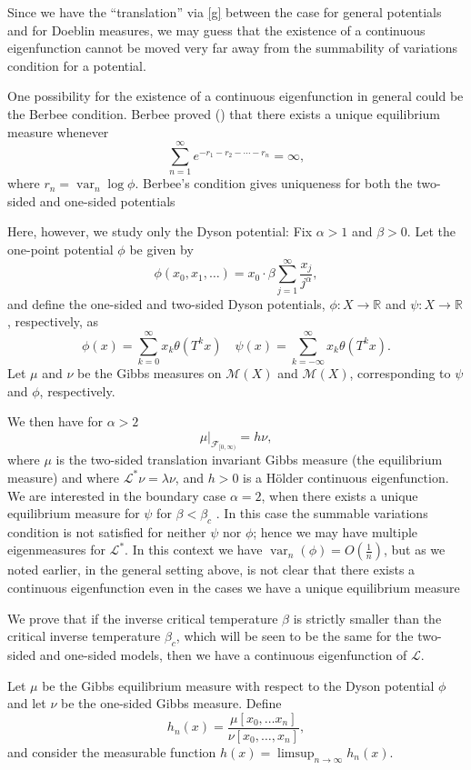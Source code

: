 \documentclass[11pt, a4paper]{amsart}
\theoremstyle{definition}
\theoremstyle{remark}
\providecommand{\RR}{\mathbb{R}}
\providecommand{\CM}{\mathscr{M}}
\providecommand{\opn}{\operatorname}
\providecommand{\var}{\opn{var}}
\def\X{X}
\begin{document}
Since we have the ``translation'' via \eqref{g} between the case for general potentials and for Doeblin measures, we may guess that the existence of a continuous eigenfunction cannot be moved very far away from the summability of variations condition for a potential.

One possibility for the existence of a continuous eigenfunction in general could be the Berbee condition.
Berbee proved (\cite{berbee89}) that there exists a
unique equilibrium measure whenever
\begin{equation}\label{berbee}
  \sum_{n=1}^\infty e^{-r_1-r_2-\cdots-r_n}=\infty,    
\end{equation}
where $r_n=\var_n \log \phi$. Berbee's condition
gives uniqueness for both the two-sided and
one-sided potentials

Here, however, we study only the Dyson potential: Fix $\alpha>1$ and $\beta>0$. Let the one-point potential $\phi$ be given by
$$\phi(x_0, x_1,\ldots)=x_0\cdot \beta \sum_{j=1}^\infty \frac{x_j}{j^\alpha},$$
and define the one-sided and two-sided 
Dyson potentials, $\phi:\X\to \RR$ and $\psi:\X\to\RR$, respectively, as
$$
\phi(x)=\sum_{k=0}^\infty x_k \theta (T^k x) \quad
\psi(x)=\sum_{k=-\infty}^\infty x_k \theta(T^k x).
$$
Let $\mu$ and $\nu$ be the Gibbs measures on $\CM(\X)$ and $\CM(\X)$, corresponding to $\psi$ and $\phi$, respectively.

We then have for $\alpha>2$
$$\mu\vert_{{\mathcal F}_{[0,\infty)}}= h\nu,$$
where $\mu$ is the two-sided translation invariant Gibbs measure (the
equilibrium measure) and where ${\mathcal L}^*\nu=\lambda \nu$, and $h>0$ is a
H\"older continuous eigenfunction. We are interested in the boundary case
$\alpha=2$, when there exists a unique equilibrium measure for $\psi$ for
$\beta<\beta_c$ \cite{ACCN}. In this case the summable variations condition is not satisfied
for neither $\psi$ nor $\phi$; hence we may have multiple eigenmeasures for
${\mathcal L}^*$. In this context we have $\var_n(\phi)=O(\frac{1}{n})$, but as we noted earlier, in the general setting above, is not clear that there exists a continuous eigenfunction even in the cases we have a unique
equilibrium measure

We prove that if the inverse critical temperature $\beta$ is strictly smaller than the critical inverse temperature $\beta_c$, which will be seen to be the same for the two-sided and one-sided models, then we have a continuous eigenfunction of ${\mathcal L}$.

Let $\mu$ be the Gibbs equilibrium measure with respect
to the Dyson potential $\phi$ and let $\nu$ be the one-sided Gibbs measure.
Define
$$
h_n(x)=\frac{\mu[x_0,\ldots x_n]}{\nu[x_0,\ldots, x_n]},
$$
and consider the measurable function $h(x)=\limsup_{n\to \infty}h_n(x)$. 
\end{document}
